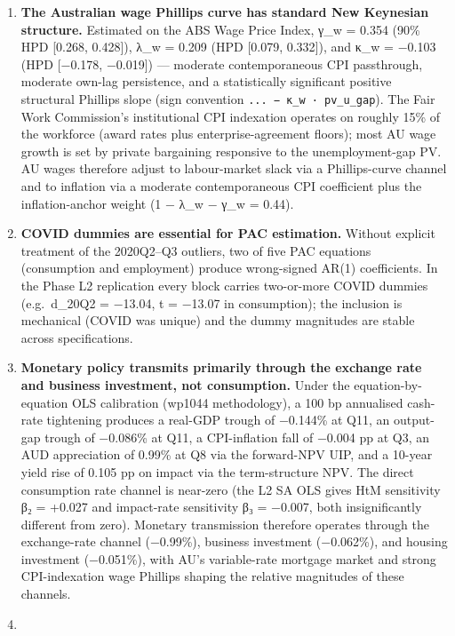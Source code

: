 \documentclass[
]{article}
\begin{document}
\begin{enumerate}
\def\labelenumi{\arabic{enumi}.}
\setcounter{enumi}{3}
\item
  \textbf{The Australian wage Phillips curve has standard New Keynesian
  structure.} Estimated on the ABS Wage Price Index, γ\_w = 0.354 (90\%
  HPD {[}0.268, 0.428{]}), λ\_w = 0.209 (HPD {[}0.079, 0.332{]}), and
  κ\_w = −0.103 (HPD {[}−0.178, −0.019{]}) --- moderate contemporaneous
  CPI passthrough, moderate own-lag persistence, and a statistically
  significant positive structural Phillips slope (sign convention
  \texttt{...\ −\ κ\_w\ ·\ pv\_u\_gap}). The Fair Work Commission's
  institutional CPI indexation operates on roughly 15\% of the workforce
  (award rates plus enterprise-agreement floors); most AU wage growth is
  set by private bargaining responsive to the unemployment-gap PV. AU
  wages therefore adjust to labour-market slack via a Phillips-curve
  channel and to inflation via a moderate contemporaneous CPI
  coefficient plus the inflation-anchor weight (1 − λ\_w − γ\_w = 0.44).
\item
  \textbf{COVID dummies are essential for PAC estimation.} Without
  explicit treatment of the 2020Q2--Q3 outliers, two of five PAC
  equations (consumption and employment) produce wrong-signed AR(1)
  coefficients. In the Phase L2 replication every block carries
  two-or-more COVID dummies (e.g.~d\_20Q2 = −13.04, t = −13.07 in
  consumption); the inclusion is mechanical (COVID was unique) and the
  dummy magnitudes are stable across specifications.
\item
  \textbf{Monetary policy transmits primarily through the exchange rate
  and business investment, not consumption.} Under the
  equation-by-equation OLS calibration (wp1044 methodology), a 100 bp
  annualised cash-rate tightening produces a real-GDP trough of −0.144\%
  at Q11, an output-gap trough of −0.086\% at Q11, a CPI-inflation fall
  of −0.004 pp at Q3, an AUD appreciation of 0.99\% at Q8 via the
  forward-NPV UIP, and a 10-year yield rise of 0.105 pp on impact via
  the term-structure NPV. The direct consumption rate channel is
  near-zero (the L2 SA OLS gives HtM sensitivity β₂ = +0.027 and
  impact-rate sensitivity β₃ = −0.007, both insignificantly different
  from zero). Monetary transmission therefore operates through the
  exchange-rate channel (−0.99\%), business investment (−0.062\%), and
  housing investment (−0.051\%), with AU's variable-rate mortgage market
  and strong CPI-indexation wage Phillips shaping the relative
  magnitudes of these channels.
\item

\end{enumerate}
\end{document}
